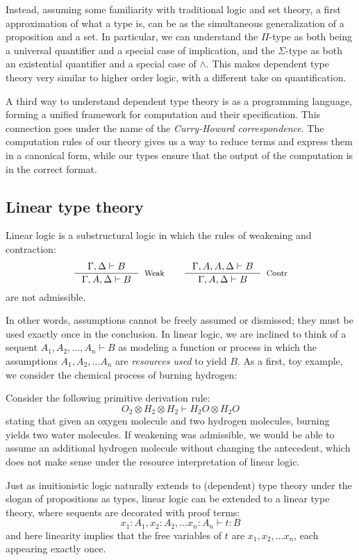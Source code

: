 Instead, assuming some familiarity with traditional logic and set theory, a first approximation of what a type is, can be as the simultaneous generalization of a proposition and a set. In particular, we can understand the $\Pi$-type as both being a universal quantifier and a special case of implication, and the $\Sigma$-type as both an existential quantifier and a special case of $\land$. This makes dependent type theory very similar to higher order logic, with a different take on quantification.

A third way to understand dependent type theory is as a programming language, forming a unified framework for computation and their specification. This connection goes under the name of the \textit{Curry-Howard correspondence}. The computation rules of our theory gives us a way to reduce terms and express them in a canonical form, while our types ensure that the output of the computation is in the correct format.
\subsection{Linear type theory}
Linear logic is a substructural logic in which the rules of weakening and contraction:
\[
  \begin{split}
    \inference{\Gamma, \Delta \vdash B}{\Gamma, A, \Delta \vdash B}[Weak] \quad \quad 
    \inference{\Gamma, A, A, \Delta \vdash B}{\Gamma, A, \Delta \vdash B}[Contr]
    \end{split}
\]
are not admissible.


In other words, assumptions cannot be freely assumed or dismissed; they must be used exactly once in the conclusion. In linear logic, we are inclined to think of a sequent $A_1, A_2, \dots, A_n \vdash B$ as modeling a function or process in which the assumptions $A_1, A_2, \dots A_n$ are \textit{resources used} to yield $B$. As a first, toy example, we consider the chemical process of burning hydrogen:
\begin{expl}\label{burn}
Consider the following primitive derivation rule: 
\[
  O_2 \otimes H_2 \otimes H_2 \vdash H_2O \otimes H_2O
\]
stating that given an oxygen molecule and two hydrogen molecules, burning yields two water molecules. If weakening was admissible, we would be able to assume an additional hydrogen molecule without changing the antecedent, which does not make sense under the resource interpretation of linear logic.
\end{expl}

Just as inuitionistic logic naturally extends to (dependent) type theory under the slogan of propositions as types, linear logic can be extended to a linear type theory, where sequents are decorated with proof terms:
\[
  x_1 : A_1, x_2 : A_2, \dots x_n : A_n \vdash t : B
\]
and here linearity implies that the free variables of $t$ are $x_1, x_2, \dots x_n$, each appearing exactly once.


